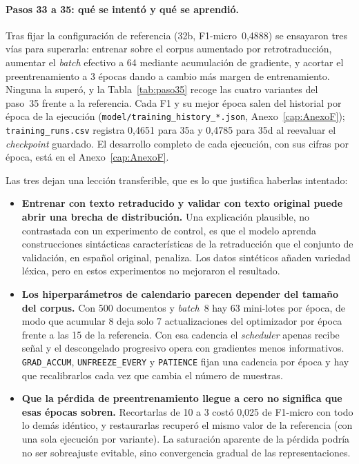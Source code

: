 \paragraph{Pasos 33 a 35: qué se intentó y qué se aprendió.}
Tras fijar la configuración de referencia (32b, F1-micro~0,4888) se ensayaron tres vías para superarla: entrenar sobre el corpus aumentado por retrotraducción, aumentar el \emph{batch} efectivo a 64 mediante acumulación de gradiente, y acortar el preentrenamiento a 3 épocas dando a cambio más margen de entrenamiento. Ninguna la superó, y la Tabla~\ref{tab:paso35} recoge las cuatro variantes del paso~35 frente a la referencia. Cada F1 y su mejor época salen del historial por época de la ejecución (\texttt{model/\allowbreak{}training\_history\_*.json}, Anexo~\ref{cap:AnexoF}); \texttt{training\_runs.csv} registra 0,4651 para 35a y 0,4785 para 35d al reevaluar el \emph{checkpoint} guardado. El desarrollo completo de cada ejecución, con sus cifras por época, está en el Anexo~\ref{cap:AnexoF}.

Las tres dejan una lección transferible, que es lo que justifica haberlas intentado:

\begin{itemize}
 \item \textbf{Entrenar con texto retraducido y validar con texto original puede abrir una brecha de distribución.} Una explicación plausible, no contrastada con un experimento de control, es que el modelo aprenda construcciones sintácticas características de la retraducción que el conjunto de validación, en español original, penaliza. Los datos sintéticos añaden variedad léxica, pero en estos experimentos no mejoraron el resultado.
 \item \textbf{Los hiperparámetros de calendario parecen depender del tamaño del corpus.} Con 500 documentos y \emph{batch}~8 hay 63 mini-lotes por época, de modo que acumular 8 deja solo 7 actualizaciones del optimizador por época frente a las 15 de la referencia. Con esa cadencia el \emph{scheduler} apenas recibe señal y el descongelado progresivo opera con gradientes menos informativos. \texttt{GRAD\_ACCUM}, \texttt{UNFREEZE\_EVERY} y \texttt{PATIENCE} fijan una cadencia por época y hay que recalibrarlos cada vez que cambia el número de muestras.
 \item \textbf{Que la pérdida de preentrenamiento llegue a cero no significa que esas épocas sobren.} Recortarlas de 10 a 3 costó 0,025 de F1-micro con todo lo demás idéntico, y restaurarlas recuperó el mismo valor de la referencia (con una sola ejecución por variante). La saturación aparente de la pérdida podría no ser sobreajuste evitable, sino convergencia gradual de las representaciones.
\end{itemize}

